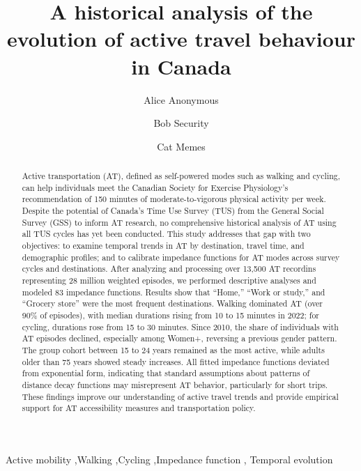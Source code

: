 \documentclass[preprint, 3p,
authoryear]{elsarticle} %
\begin{document}
\begin{frontmatter}

  \title{A historical analysis of the evolution of active travel
behaviour in Canada}
    \author[Some Institute of Technology]{Alice Anonymous%
  }
    \author[Some Institute of Technology]{Bob Security%
  }
    \author[Some Institute of Technology]{Cat Memes%
  }
  
  \begin{abstract}
  Active transportation (AT), defined as self-powered modes such as
  walking and cycling, can help individuals meet the Canadian Society
  for Exercise Physiology's recommendation of 150 minutes of
  moderate-to-vigorous physical activity per week. Despite the potential
  of Canada's Time Use Survey (TUS) from the General Social Survey (GSS)
  to inform AT research, no comprehensive historical analysis of AT
  using all TUS cycles has yet been conducted. This study addresses that
  gap with two objectives: to examine temporal trends in AT by
  destination, travel time, and demographic profiles; and to calibrate
  impedance functions for AT modes across survey cycles and
  destinations. After analyzing and processing over 13,500 AT recordins
  representing 28 million weighted episodes, we performed descriptive
  analyses and modeled 83 impedance functions. Results show that
  ``Home,'' ``Work or study,'' and ``Grocery store'' were the most
  frequent destinations. Walking dominated AT (over 90\% of episodes),
  with median durations rising from 10 to 15 minutes in 2022; for
  cycling, durations rose from 15 to 30 minutes. Since 2010, the share
  of individuals with AT episodes declined, especially among Women+,
  reversing a previous gender pattern. The group cohort between 15 to 24
  years remained as the most active, while adults older than 75 years
  showed steady increases. All fitted impedance functions deviated from
  exponential form, indicating that standard assumptions about patterns
  of distance decay functions may misrepresent AT behavior, particularly
  for short trips. These findings improve our understanding of active
  travel trends and provide empirical support for AT accessibility
  measures and transportation policy.
  \end{abstract}
    \begin{keyword}
    Active mobility \sep Walking \sep Cycling \sep Impedance
function \sep 
    Temporal evolution
  \end{keyword}
  
 \end{frontmatter}
\end{document}
